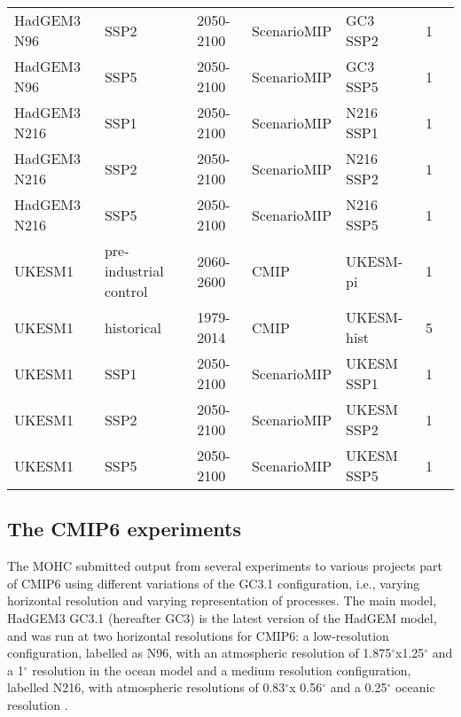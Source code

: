 \begin{sidewaystable}
\begin{tabular}{p{3.1cm}|p{3.8cm}p{}p{2.8cm}p{3.5cm}p{0.9cm}p{3.6cm}}
HadGEM3 N96   & SSP2 & 2050-2100 & ScenarioMIP  & GC3 SSP2  & 1  &   \citep{o2016}                          \\
HadGEM3 N96   & SSP5 & 2050-2100 & ScenarioMIP  & GC3 SSP5 & 1  &   \citep{o2016}                          \\
HadGEM3 N216   & SSP1 & 2050-2100 & ScenarioMIP  & N216 SSP1  & 1  &   \citep{o2016}                          \\
HadGEM3 N216   & SSP2 & 2050-2100 & ScenarioMIP  & N216 SSP2  & 1  &   \citep{o2016}                          \\
HadGEM3 N216   & SSP5 & 2050-2100 & ScenarioMIP  & N216 SSP5  & 1  &   \citep{o2016}                          \\
UKESM1   &  pre-industrial control  & 2060-2600       & CMIP & UKESM-pi      & 1 & \citep{ukesmpi}            \\
UKESM1   &  historical  & 1979-2014       & CMIP & UKESM-hist & 5     &  \citep{ukesmhist}            \\
UKESM1  & SSP1 & 2050-2100 & ScenarioMIP  & UKESM SSP1  & 1  &   \citep{o2016}                          \\
UKESM1  & SSP2 & 2050-2100 & ScenarioMIP  & UKESM SSP2  & 1  &   \citep{o2016}                          \\
UKESM1   & SSP5 & 2050-2100 & ScenarioMIP  & UKESM SSP5  & 1  &   \citep{o2016}
\end{tabular}
\end{sidewaystable}

\subsection{The CMIP6 experiments}\label{sq:cmip6exp}

The MOHC submitted output from several experiments to various projects part of CMIP6 using different variations of the GC3.1 configuration, i.e., varying horizontal resolution and varying representation of processes. 
The main model, HadGEM3 GC3.1 (hereafter GC3) is the latest version of the HadGEM model, and was run at two horizontal resolutions for CMIP6: a low-resolution configuration, labelled as N96, with an atmospheric resolution of 1.875$^\circ$x1.25$^\circ$ and a 1$^\circ$ resolution in the ocean model and a medium resolution configuration, labelled N216, with atmospheric resolutions of 0.83$^\circ$x 0.56$^\circ$ and a 0.25$^\circ$ oceanic resolution \citep{menary2018}. 

